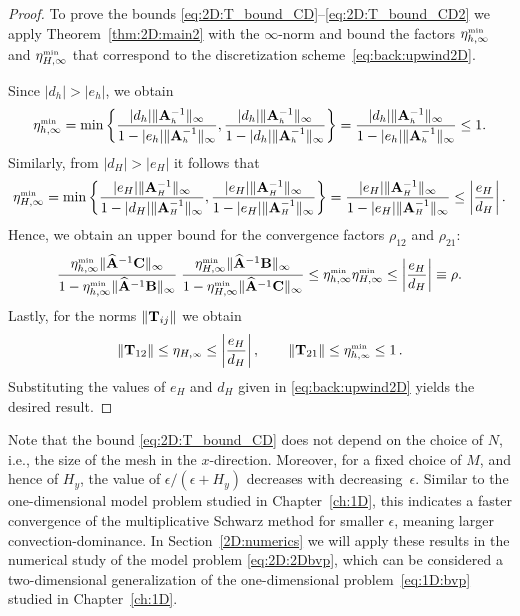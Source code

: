 \begin{proof}
%
To prove the bounds \eqref{eq:2D:T_bound_CD}--\eqref{eq:2D:T_bound_CD2}
we apply Theorem~\ref{thm:2D:main2} with the $\infty$-norm and bound the
factors $\eta_{h,\infty}^{\scriptscriptstyle \min}$ and $\eta_{H,\infty}^{\scriptscriptstyle \min}$
that correspond to the discretization scheme~\eqref{eq:back:upwind2D}.

Since $|d_{h}|>|e_{h}|$, we obtain
%
\[
  \eta_{h,\infty}^{\scriptscriptstyle \min} = \min \left\{ \frac{|d_h| \|\mathbf{A}_{\scriptscriptstyle h}^{-1}\|_{\infty}}
  {1-|e_h|\|\mathbf{A}_{\scriptscriptstyle h}^{-1}\|_{\infty}},  \frac{|d_h|\|\mathbf{A}_{\scriptscriptstyle h}^{-1}\|_{\infty}}
  {1-|d_h|\|\mathbf{A}_{\scriptscriptstyle h}^{-1}\|_{\infty}} \right\} =  \frac{|d_h|\|\mathbf{A}_{\scriptscriptstyle h}^{-1}\|_{\infty}}
  {1-|e_h|\|\mathbf{A}_{\scriptscriptstyle h}^{-1}\|_{\infty}} \leq 1.
\]
%
Similarly, from $|d_{H}|>|e_{H}|$ it follows that
%
\[
\eta_{H,\infty}^{\scriptscriptstyle \min}
= \min \left\{\frac{|e_H|\|\mathbf{A}_{\scriptscriptstyle H}^{-1}\|_{\infty}}{1-|d_H| \|\mathbf{A}_{\scriptscriptstyle H}^{-1}\|_{\infty}},
\frac{|e_H|\|\mathbf{A}_{\scriptscriptstyle H}^{-1}\|_{\infty} }{1-|e_H|\|\mathbf{A}_{\scriptscriptstyle H}^{-1}\|_{\infty}}\right\}
= \frac{|e_H|\|\mathbf{A}_{\scriptscriptstyle H}^{-1}\|_{\infty} }{1-|e_H|\|\mathbf{A}_{\scriptscriptstyle H}^{-1}\|_{\infty}}
\leq \left|\frac{e_H}{d_H}\right|.
\]
%
Hence, we obtain an upper bound for the convergence factors $\rho_{12}$ and $\rho_{21}$:
%
\begin{equation*}
\frac{\eta_{h,\infty}^{\scriptscriptstyle \min} \|\widehat{\mathbf{A}}^{-1}\mathbf{C}\|_{\infty}}{1-\eta_{h,\infty}^{\scriptscriptstyle \min}
\|\widehat{\mathbf{A}}^{-1}\mathbf{B}\|_{\infty}}\;
\frac{\eta_{H,\infty}^{\scriptscriptstyle \min}\|\widehat{\mathbf{A}}^{-1}\mathbf{B}\|_{\infty}}{1-
\eta_{H,\infty}^{\scriptscriptstyle \min}\|\widehat{\mathbf{A}}^{-1}\mathbf{C}\|_{\infty}}
\leq \eta_{h,\infty}^{\scriptscriptstyle \min}\eta_{H,\infty}^{\scriptscriptstyle \min} \leq \left|\frac{e_H}{d_H}\right|\equiv \rho.
\end{equation*}
%
Lastly, for the norms $\| \mathbf{T}_{ij} \|$ we obtain
%
\[
	\| \mathbf{T}_{12} \| \leq
	\eta_{H,\scriptscriptstyle \infty} \leq
	\left|\frac{e_H}{d_H}\right|,\qquad
	\| \mathbf{T}_{21} \| \leq \eta_{h,\scriptscriptstyle \infty}^{\scriptscriptstyle \min} \leq 1\,.
\]
Substituting the values of $e_H$ and $d_H$ given in \eqref{eq:back:upwind2D}
yields the desired result.
\end{proof}

Note that the bound \eqref{eq:2D:T_bound_CD} does not depend on the
choice of $N$, i.e., the size of the mesh in the $x$-direction. Moreover, for
a fixed choice of $M$, and hence of $H_y$, the value of $\epsilon/(\epsilon+H_y)$
decreases with decreasing~$\epsilon$. Similar to the one-dimensional model
problem studied in Chapter~\ref{ch:1D}, this indicates a faster convergence
of the multiplicative Schwarz method for smaller $\epsilon$, meaning larger
convection-dominance. In Section~\ref{2D:numerics} we will apply these results
in the  numerical study of the model problem \eqref{eq:2D:2Dbvp}, which can be
considered a two-dimensional generalization of the one-dimensional
problem~\eqref{eq:1D:bvp} studied in Chapter~\ref{ch:1D}.

